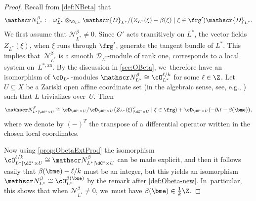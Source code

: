 \begin{proof}
Recall from \cref{def:NBeta} that
\[
\mathscr N_{L^*}^\beta := \omega_{L^*}^\vee \otimes_{\O_{L^*}} \mathscr{D}_{L^*}/(Z_{L^*}(\xi)-\beta(\xi) \mid \xi \in \frg')\mathscr{D}_{L^*}.
\]
We first assume that $\mathscr N_{L^*}^\beta \neq 0$. Since $G'$ acts transitively on $L^*$, the vector fields $Z_{L^*}(\xi)$, when $\xi$ runs through $\frg'$, generate the tangent bundle of $L^*$. This implies that~$\mathscr N_{L^*}^\beta$ is a smooth $\mathscr{D}_{L^*}$\nobreakdash-mod\-ule of rank one, \ie corresponds to a local system on~$L^{*,\mathrm{an}}$.
By the discussion in \cref{sec:OBeta}, we~therefore have an isomorphism of $\cD_{L^*}$\nobreakdash-mod\-ules
$\mathscr N_{L^*}^\beta\cong \cO_{L^*}^{\ell/k}$ for some $\ell\in\Z$. Let $U\subseteq X$ be a Zariski open affine coordinate set (in the algebraic sense, see, e.g., \cite[Def.\,A.5.2]{Hotta}) such that $L$ trivializes over~$U$. Then
\[
\mathscr N_{L^*|\dC^*\times U}^\beta \cong
\cD_{\dC^*\times U}/\cD_{\dC^*\times U}\bigl(Z_{L^*}(\xi)_{|\dC^*\times U}^T\mid \xi\in\frg)+
\cD_{\dC^*\times U}(-\partial_t t -\beta(\bme)\bigr),
\]
where we denote by $(-)^T$ the transpose of a differential operator written in the chosen local coordinates.

Now using \cref{prop:ObetaExtProd} the isomorphism $\cO_{L^*|\dC^*\times U}^{\ell/k}\cong \mathscr N_{L^*|\dC^*\times U}^\beta$ can be made explicit, and then it follows easily that $\beta(\bme)-\ell/k$ must be an integer, but this yields an isomorphism $ \mathscr N_{L^*}^\beta \cong \cO_{L^*}^{\beta(\bme)}$ by the remark after \cref{def:Obeta-new}. In~particular, this shows that when $\mathscr N_{L^*}^\beta\neq 0$, we~must have $\beta(\bme)\in\frac{1}{k}\Z$.


\end{proof}

